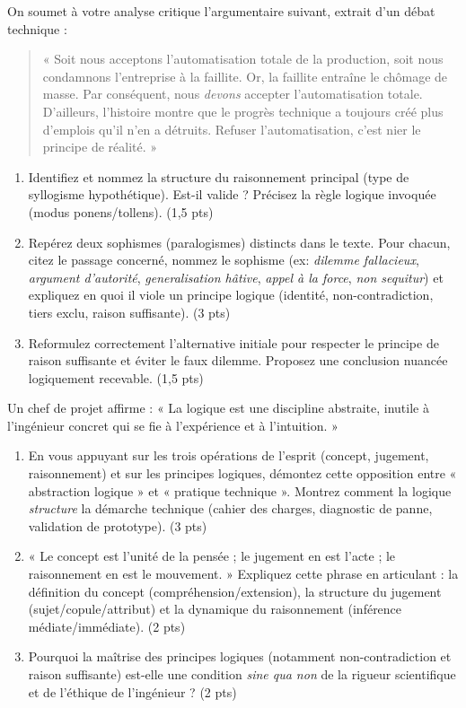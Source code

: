 \documentclass[11pt]{article}
\begin{document}
\begin{exercice}
On soumet à votre analyse critique l'argumentaire suivant, extrait d'un débat technique : 
\begin{quote}
« Soit nous acceptons l'automatisation totale de la production, soit nous condamnons l'entreprise à la faillite. Or, la faillite entraîne le chômage de masse. Par conséquent, nous \textit{devons} accepter l'automatisation totale. D'ailleurs, l'histoire montre que le progrès technique a toujours créé plus d'emplois qu'il n'en a détruits. Refuser l'automatisation, c'est nier le principe de réalité. »
\end{quote}
\begin{enumerate}
    \item Identifiez et nommez la structure du raisonnement principal (type de syllogisme hypothétique). Est-il valide ? Précisez la règle logique invoquée (modus ponens/tollens). (1,5 pts)
    \item Repérez deux sophismes (paralogismes) distincts dans le texte. Pour chacun, citez le passage concerné, nommez le sophisme (ex: \textit{dilemme fallacieux}, \textit{argument d'autorité}, \textit{generalisation hâtive}, \textit{appel à la force}, \textit{non sequitur}) et expliquez en quoi il viole un principe logique (identité, non-contradiction, tiers exclu, raison suffisante). (3 pts)
    \item Reformulez correctement l'alternative initiale pour respecter le principe de raison suffisante et éviter le faux dilemme. Proposez une conclusion nuancée logiquement recevable. (1,5 pts)
\end{enumerate}
\end{exercice}

\begin{exercice}
Un chef de projet affirme : « La logique est une discipline abstraite, inutile à l'ingénieur concret qui se fie à l'expérience et à l'intuition. »
\begin{enumerate}
    \item En vous appuyant sur les trois opérations de l'esprit (concept, jugement, raisonnement) et sur les principes logiques, démontez cette opposition entre « abstraction logique » et « pratique technique ». Montrez comment la logique \textit{structure} la démarche technique (cahier des charges, diagnostic de panne, validation de prototype). (3 pts)
    \item « Le concept est l'unité de la pensée ; le jugement en est l'acte ; le raisonnement en est le mouvement. » Expliquez cette phrase en articulant : la définition du concept (compréhension/extension), la structure du jugement (sujet/copule/attribut) et la dynamique du raisonnement (inférence médiate/immédiate). (2 pts)
    \item Pourquoi la maîtrise des principes logiques (notamment non-contradiction et raison suffisante) est-elle une condition \textit{sine qua non} de la rigueur scientifique et de l'éthique de l'ingénieur ? (2 pts)
\end{enumerate}
\end{exercice}
\end{document}
